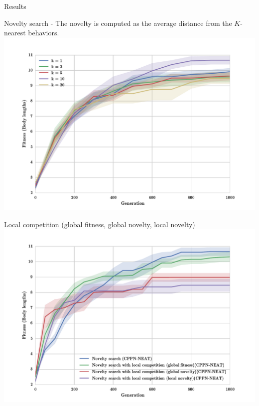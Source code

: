 \documentclass{beamer}
\begin{document}
\begin{frame}[allowframebreaks]{Results}
\begin{minipage}{\textwidth}
\begin{block}{Novelty search - The novelty is computed as the average distance from the $K$-nearest behaviors.}
\includegraphics[width=1.0\textwidth]{figures/results/KnnExperimentSize5.pdf}
\end{block}
\end{minipage}

\begin{minipage}{\textwidth}
\begin{block}{Local competition (global fitness, global novelty, local novelty)}
\includegraphics[width=1.0\textwidth]{figures/results/NoveltyCompetitionsSize5.pdf}
\end{block}
\end{minipage}


\end{frame}
\end{document}
